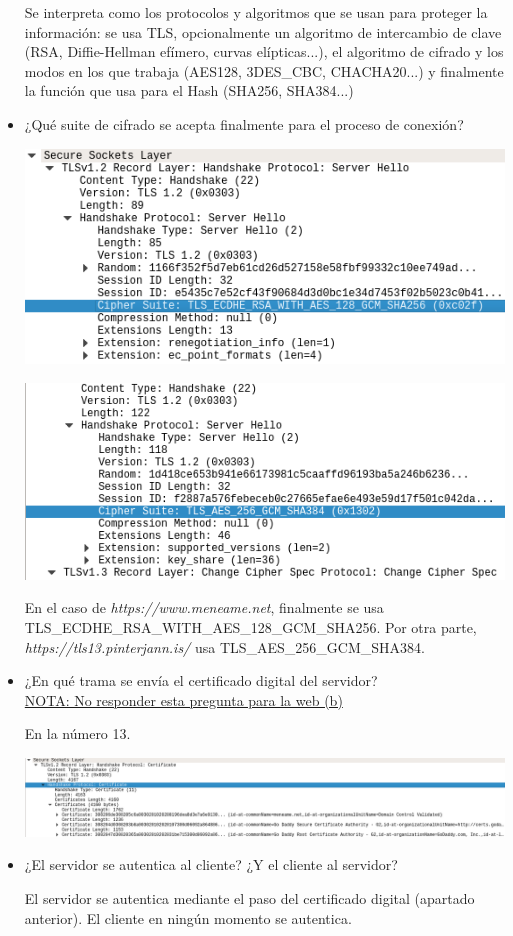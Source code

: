 \documentclass{article}
\begin{document}
\begin{itemize}
Se interpreta como los protocolos y algoritmos que se usan para proteger la información: se usa TLS, opcionalmente un algoritmo de intercambio de clave (RSA, Diffie-Hellman efímero, curvas elípticas...), el algoritmo de cifrado y los modos en los que trabaja (AES128, 3DES\_CBC, CHACHA20...) y finalmente la función que usa para el Hash (SHA256, SHA384...)
\item ¿Qué suite de cifrado se acepta finalmente para el proceso de conexión?

\begin{center}
\includegraphics[scale=0.4]{suite.png}
\end{center}

\begin{center}
\includegraphics[scale=0.35]{suite2.png}
\end{center}

En el caso de \textit{https://www.meneame.net}, finalmente se usa \\TLS\_ECDHE\_RSA\_WITH\_AES\_128\_GCM\_SHA256. Por otra parte, \textit{https://tls13.pinterjann.is/} usa TLS\_AES\_256\_GCM\_SHA384.
\item ¿En qué trama se envía el certificado digital del servidor? \\ \underline{NOTA: No responder esta pregunta para la web (b)}

En la número 13.

\begin{center}
\includegraphics[scale=0.3]{certificate.png}
\end{center}
\item ¿El servidor se autentica al cliente? ¿Y el cliente al servidor?

El servidor se autentica mediante el paso del certificado digital (apartado anterior). El cliente en ningún momento se autentica.
\end{itemize}
\end{document}
